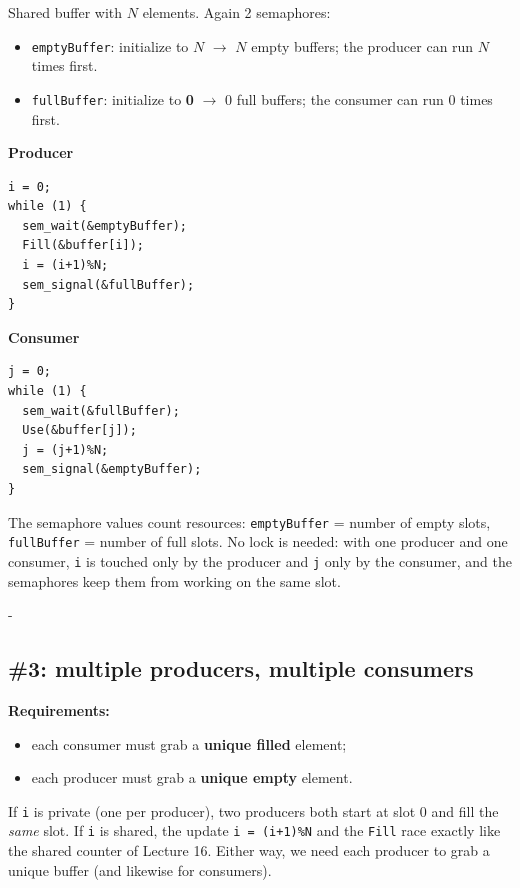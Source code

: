 \documentclass[11pt,a4paper]{article}
\makeatletter
\newcommand{\keepspace}[1]{\par\penalty-100\begingroup
  \setlength{\dimen@}{#1}\dimen@ii\pagegoal\advance\dimen@ii-\pagetotal
  \ifdim\dimen@>\dimen@ii\ifdim\dimen@ii>\z@\vfil\fi\break\fi\endgroup}
\makeatother
\begin{document}
Shared buffer with \(N\) elements. Again 2 semaphores:
\begin{itemize}
  \item \texttt{emptyBuffer}: initialize to \textbf{\(N\)} \(\to\) \(N\)
        empty buffers; the producer can run \(N\) times first.
  \item \texttt{fullBuffer}: initialize to \textbf{0} \(\to\) 0 full
        buffers; the consumer can run 0 times first.
\end{itemize}

\begin{center}
\begin{minipage}[t]{0.47\textwidth}
\textbf{Producer}
\begin{lstlisting}[numbers=none]
i = 0;
while (1) {
  sem_wait(&emptyBuffer);
  Fill(&buffer[i]);
  i = (i+1)%N;
  sem_signal(&fullBuffer);
}
\end{lstlisting}
\end{minipage}\hfill
\begin{minipage}[t]{0.47\textwidth}
\textbf{Consumer}
\begin{lstlisting}[numbers=none]
j = 0;
while (1) {
  sem_wait(&fullBuffer);
  Use(&buffer[j]);
  j = (j+1)%N;
  sem_signal(&emptyBuffer);
}
\end{lstlisting}
\end{minipage}
\end{center}

The semaphore values count resources: \texttt{emptyBuffer} = number of empty
slots, \texttt{fullBuffer} = number of full slots. No lock is needed: with
one producer and one consumer, \texttt{i} is touched only by the producer
and \texttt{j} only by the consumer, and the semaphores keep them from
working on the same slot.

\keepspace{16\baselineskip}
\subsection{\#3: multiple producers, multiple consumers}

\textbf{Requirements:}
\begin{itemize}
  \item each consumer must grab a \textbf{unique filled} element;
  \item each producer must grab a \textbf{unique empty} element.
\end{itemize}

\begin{quizbox}
If \texttt{i} is private (one per producer), two producers both start at
slot 0 and fill the \emph{same} slot. If \texttt{i} is shared, the update
\texttt{i = (i+1)\%N} and the \texttt{Fill} race exactly like the shared
counter of Lecture 16. Either way, we need each producer to grab a unique
buffer (and likewise for consumers).
\end{quizbox}
\end{document}
